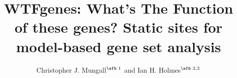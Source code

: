 \documentclass{bioinfo}
\begin{document}

\newcommand\structabs[5]{
\abstract{
{\bf Motivation.}
#1
{\bf Results.}
#2
{\bf Availability and Implementation.}
#3
{\bf Contact.}
#4
{\bf Supplementary Information.}
#5
}
\maketitle
}

\title[WTFgenes]{WTFgenes: What's The Function of these genes? Static sites for model-based gene set analysis}
\author[Christopher J. Mungall and Ian H. Holmes]{Christopher J. Mungall$^{\text{\sfb 1}}$ and Ian H. Holmes$^{\text{\sfb 2,3}}$}
\address{
  $^{\text{\sf 1}}$Environmental Genomics and Systems Biology Division, Lawrence Berkeley National Laboratory, 1 Cyclotron Rd, Berkeley, CA 94720, USA. \\
  $^{\text{\sf 2}}$Department of Bioengineering, University of California, Berkeley, CA 94720, USA. \\
  $^{\text{\sf 3}}$Molecular Biophysics and Integrated Bioimaging Division, Lawrence Berkeley National Laboratory, 1 Cyclotron Rd, Berkeley, CA 94720, USA.
}

\corresp{}

\history{}

\editor{}


\end{document}
